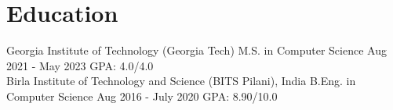 \vspace{-2.5mm}
\section{Education}

\resumeSubHeadingListStart
\resumeEdu
{Georgia Institute of Technology (Georgia Tech)} 
{M.S. in Computer Science} 
{Aug 2021 - May 2023} %
{GPA: 4.0/4.0} %
\\
\resumeEdu
{Birla Institute of Technology and Science (BITS Pilani), India} 
{B.Eng. in Computer Science} 
{Aug 2016 - July 2020} %
{GPA: 8.90/10.0} %
\resumeSubHeadingListEnd
\vspace{-3.5mm}